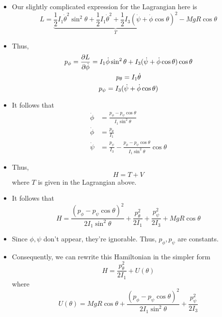 \documentclass[../notes.tex]{subfiles}
\begin{document}
\begin{itemize}
\begin{itemize}
        \item Our slightly complicated expression for the Lagrangian here is
        \begin{equation*}
            L = \underbrace{\frac{1}{2}I_1\dot{\theta}^2\sin^2\theta+\frac{1}{2}I_1\dot{\theta}^2+\frac{1}{2}I_3(\dot{\psi}+\dot{\phi}\cos\theta)^2}_T-MgR\cos\theta
        \end{equation*}
        \item Thus,
        \begin{gather*}
            p_\phi = \pdv{L}{\dot{\phi}} = I_1\dot{\phi}\sin^2\theta+I_3(\dot{\psi}+\dot{\phi}\cos\theta)\cos\theta\\
            p_\theta = I_1\dot{\theta}\\
            p_\psi = I_3(\dot{\psi}+\dot{\phi}\cos\theta)
        \end{gather*}
        \item It follows that
        \begin{align*}
            \dot{\phi} &= \frac{p_\phi-p_\psi\cos\theta}{I_1\sin^2\theta}\\
            \dot{\phi} &= \frac{p_\theta}{I_1}\\
            \dot{\psi} &= \frac{p_\psi}{I_3}-\frac{p_\phi-p_\psi\cos\theta}{I_1\sin^2\theta}\cos\theta
        \end{align*}
        \item Thus,
        \begin{equation*}
            H = T+V
        \end{equation*}
        where $T$ is given in the Lagrangian above.
        \item It follows that
        \begin{equation*}
            H = \frac{(p_\phi-p_\psi\cos\theta)^2}{2I_1\sin^2\theta}+\frac{p_\theta^2}{2I_1}+\frac{p_\psi^2}{2I_3}+MgR\cos\theta
        \end{equation*}
        \item Since $\phi,\psi$ don't appear, they're ignorable. Thus, $p_\phi,p_\psi$ are constants.
        \item Consequently, we can rewrite this Hamiltonian in the simpler form
        \begin{equation*}
            H = \frac{p_\theta^2}{2I_1}+U(\theta)
        \end{equation*}
        where
        \begin{equation*}
            U(\theta) = MgR\cos\theta+\frac{(p_\phi-p_\psi\cos\theta)^2}{2I_1\sin^2\theta}+\frac{p_\psi^2}{2I_3}

\end{equation*}
\end{itemize}
\end{itemize}
\end{document}
